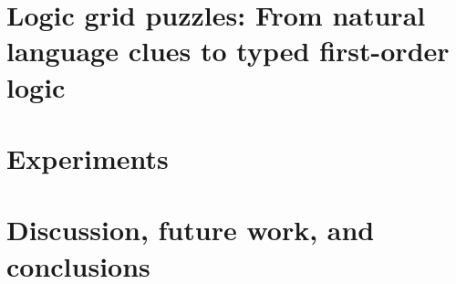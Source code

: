 \documentclass{ecai}
\begin{document}
\section{Logic grid puzzles: From natural language clues to typed first-order logic}\label{sec:holistic}



\section{Experiments}


\section{Discussion, future work, and conclusions}

\clearpage


\end{document}
